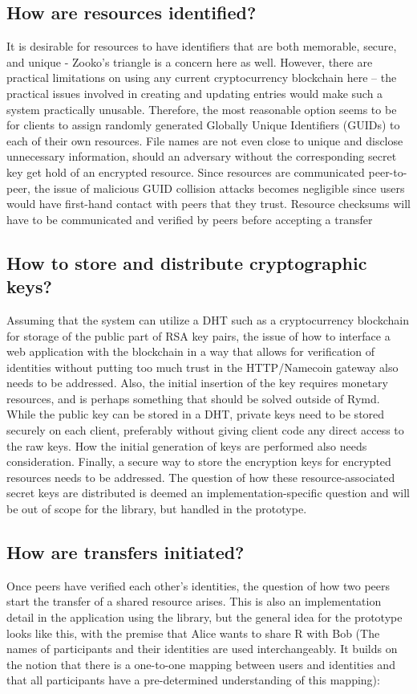 \subsection{How are resources identified?}
It is desirable for resources to have identifiers that are both memorable, secure, and unique - Zooko’s triangle is a concern here as well. However, there are practical limitations on using any current cryptocurrency blockchain here – the practical issues involved in creating and updating entries would make such a system practically unusable. Therefore, the most reasonable option seems to be for clients to assign randomly generated Globally Unique Identifiers (GUIDs) to each of their own resources. File names are not even close to unique and disclose unnecessary information, should an adversary without the corresponding secret key get hold of an encrypted resource. Since resources are communicated peer-to-peer, the issue of malicious GUID collision attacks becomes negligible since users would have first-hand contact with peers that they trust. Resource checksums will have to be communicated and verified by peers before accepting a transfer

\subsection{How to store and distribute cryptographic keys?}
Assuming that the system can utilize a DHT such as a cryptocurrency blockchain for storage of the public part of RSA key pairs, the issue of how to interface a web application with the blockchain in a way that allows for verification of identities without putting too much trust in the HTTP/Namecoin gateway also needs to be addressed. Also, the initial insertion of the key requires monetary resources, and is perhaps something that should be solved outside of Rymd.
While the public key can be stored in a DHT, private keys need to be stored securely on each client, preferably without giving client code any direct access to the raw keys. How the initial generation of keys are performed also needs consideration. Finally, a secure way to store the encryption keys for encrypted resources needs to be addressed. The question of how these resource-associated secret keys are distributed is deemed an implementation-specific question and will be out of scope for the library, but handled in the prototype.

\subsection{How are transfers initiated?}
Once peers have verified each other’s identities, the question of how two peers start the transfer of a shared resource arises. This is also an implementation detail in the application using the library, but the general idea for the prototype looks like this, with the premise that Alice wants to share R with Bob (The names of participants and their identities are used interchangeably. It builds on the notion that there is a one-to-one mapping between users and identities and that all participants have a pre-determined understanding of this mapping):

